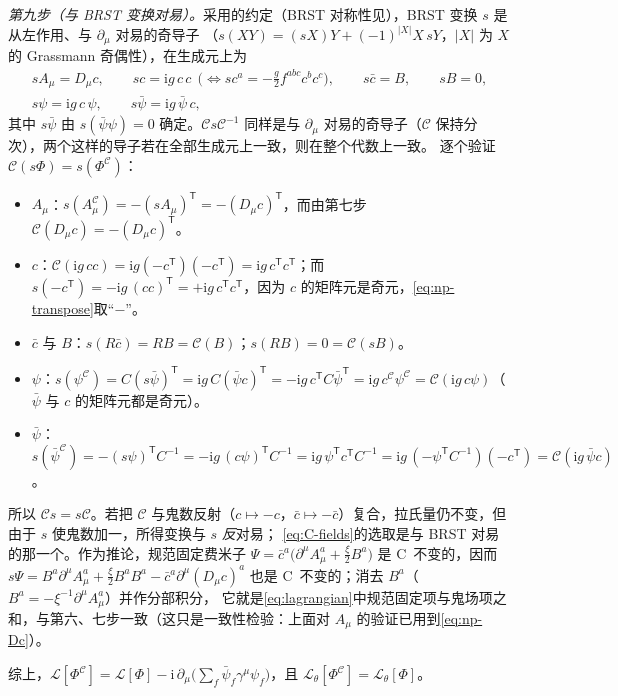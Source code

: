 \documentclass[UTF8,a4paper,11pt,fontset=fandol]{ctexart}
\makeatletter
\theoremstyle{cplain}
\theoremstyle{cdefinition}
\theoremstyle{cremark}
\renewcommand{\proofname}{证明}
\renewenvironment{proof}[1][\proofname]{\par\pushQED{\qed}\normalfont\topsep6\p@\@plus6\p@\relax
  \trivlist\item[\hskip\labelsep\itshape #1\hspace{0.5em}]\ignorespaces}{\popQED\endtrivlist\@endpefalse}
\numberwithin{equation}{section}
\newcommand{\tp}{\mathsf{T}}                         %
\newcommand{\Cop}{\mathcal{C}}                       %
\newcommand{\ii}{\mathrm{i}}                        %
\makeatother
\begin{document}
\begin{proof}
\emph{第九步（与 BRST 变换对易）。}采用\cite[第 16 章]{PeskinSchroeder1995}的约定（BRST 对称性见\cite{BRS1976,Tyutin1975}），BRST 变换 $s$ 是从左作用、与 $\partial_\mu$ 对易的奇导子
（$s(XY)=(sX)Y+(-1)^{|X|}X\,sY$，$|X|$ 为 $X$ 的 Grassmann 奇偶性），在生成元上为
\begin{equation}\label{eq:np-brst}
\begin{gathered}
sA_\mu=D_\mu c,\qquad sc=\ii g\,c\,c\ \ \bigl(\Leftrightarrow sc^a=-\tfrac g2f^{abc}c^bc^c\bigr),\qquad s\bar c=B,\qquad sB=0,\\
s\psi=\ii g\,c\,\psi,\qquad s\bar\psi=\ii g\,\bar\psi\,c ,
\end{gathered}
\end{equation}
其中 $s\bar\psi$ 由 $s(\bar\psi\psi)=0$ 确定。$\Cop s\Cop^{-1}$ 同样是与 $\partial_\mu$ 对易的奇导子（$\Cop$ 保持分次），两个这样的导子若在全部生成元上一致，则在整个代数上一致。
逐个验证 $\Cop(s\Phi)=s(\Phi^{\Cop})$：
\begin{itemize}[leftmargin=1.6em,itemsep=1pt,topsep=2pt]
\item $A_\mu$：$s(A^{\Cop}_\mu)=-(sA_\mu)^{\tp}=-(D_\mu c)^{\tp}$，而由第七步 $\Cop(D_\mu c)=-(D_\mu c)^{\tp}$。
\item $c$：$\Cop(\ii g\,cc)=\ii g(-c^{\tp})(-c^{\tp})=\ii g\,c^{\tp}c^{\tp}$；而 $s(-c^{\tp})=-\ii g\,(cc)^{\tp}=+\ii g\,c^{\tp}c^{\tp}$，因为 $c$ 的矩阵元是奇元，\cref{eq:np-transpose}取“$-$”。
\item $\bar c$ 与 $B$：$s(R\bar c)=RB=\Cop(B)$；$s(RB)=0=\Cop(sB)$。
\item $\psi$：$s(\psi^{\Cop})=C(s\bar\psi)^{\tp}=\ii g\,C(\bar\psi c)^{\tp}=-\ii g\,c^{\tp}C\bar\psi^{\tp}=\ii g\,c^{\Cop}\psi^{\Cop}=\Cop(\ii g\,c\psi)$（$\bar\psi$ 与 $c$ 的矩阵元都是奇元）。
\item $\bar\psi$：$s(\bar\psi^{\Cop})=-(s\psi)^{\tp}C^{-1}=-\ii g\,(c\psi)^{\tp}C^{-1}=\ii g\,\psi^{\tp}c^{\tp}C^{-1}=\ii g\,(-\psi^{\tp}C^{-1})(-c^{\tp})=\Cop(\ii g\,\bar\psi c)$。
\end{itemize}
所以 $\Cop s=s\Cop$。若把 $\Cop$ 与鬼数反射（$c\mapsto-c$，$\bar c\mapsto-\bar c$）复合，拉氏量仍不变，但由于 $s$ 使鬼数加一，所得变换与 $s$ \emph{反}对易；
\cref{eq:C-fields}的选取是与 BRST 对易的那一个。作为推论，规范固定费米子 $\Psi=\bar c^a\bigl(\partial^\mu A^a_\mu+\frac\xi2B^a\bigr)$ 是 C~不变的，因而
$s\Psi=B^a\partial^\mu A^a_\mu+\frac\xi2B^aB^a-\bar c^a\partial^\mu(D_\mu c)^a$ 也是 C~不变的；消去 $B^a$（$B^a=-\xi^{-1}\partial^\mu A^a_\mu$）并作分部积分，
它就是\cref{eq:lagrangian}中规范固定项与鬼场项之和，与第六、七步一致（这只是一致性检验：上面对 $A_\mu$ 的验证已用到\cref{eq:np-Dc}）。

综上，$\mathcal L[\Phi^{\Cop}]=\mathcal L[\Phi]-\ii\,\partial_\mu\bigl(\sum_f\bar\psi_f\gamma^\mu\psi_f\bigr)$，且 $\mathcal L_\theta[\Phi^{\Cop}]=\mathcal L_\theta[\Phi]$。
\end{proof}
\end{document}

